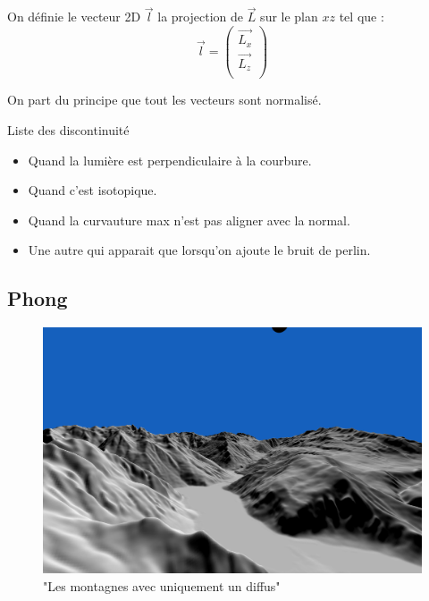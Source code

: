 \documentclass[a4paper]{article}
\begin{document}
On définie  le vecteur 2D $\vec{l}$ la projection de $\vec{L}$ sur le plan $xz$ tel que :
\[\vec{l} =  
\begin{pmatrix}
\vec{L_x} \\
\vec{L_z} \\
\end{pmatrix}\]


On part du principe que tout les vecteurs sont normalisé. 


Liste des discontinuité 
\begin{itemize}

\item Quand la lumière est perpendiculaire à la courbure.
\item Quand c'est isotopique.
\item Quand la curvauture max n'est pas aligner avec la normal.
\item Une autre qui apparait que lorsqu'on ajoute le bruit de perlin. 	

\end{itemize}


\subsection{Phong}



\begin{figure}[thb]
	\centering
    \includegraphics[scale=0.3]{Images/Essais/phong_mount.png}
    \caption{"Les montagnes avec uniquement un diffus"}
 \end{figure}
\end{document}
